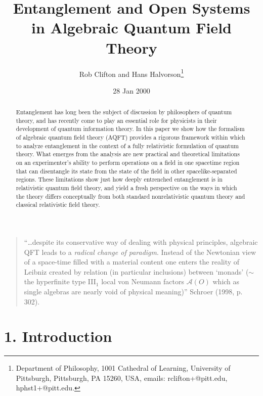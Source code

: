 \documentclass[12pt]{article}
\date{28 Jan 2000}
\title{Entanglement and Open Systems in Algebraic Quantum Field Theory}
\author{Rob Clifton and Hans Halvorson\footnote{Department of Philosophy,
 1001 Cathedral of
Learning, University of
Pittsburgh, Pittsburgh, PA 15260, USA, emails: rclifton+@pitt.edu, 
hphst1+@pitt.edu.}}
\newcommand{\alg}[1]{\mbox{$\mathcal{#1}$}}
\begin{document}
\maketitle 
\begin{abstract}
Entanglement has long been the subject of discussion by philosophers 
of quantum theory, and has recently come to play an essential role 
for physicists in their development of quantum information theory.  
In this paper we show how the formalism of algebraic quantum 
field theory (AQFT) provides a rigorous framework within which to 
analyze entanglement in the context of a fully relativistic formulation 
of quantum theory.  What emerges from the analysis 
are new practical and theoretical limitations on an 
experimenter's ability to perform operations on a field in one spacetime region 
that can disentangle its state from the state of the field in other 
spacelike-separated regions.  These limitations show just how deeply 
entrenched entanglement is in relativistic quantum field theory, and yield a 
fresh perspective on the ways in which the theory differs conceptually 
from both standard
nonrelativistic quantum theory and classical relativistic field 
theory.         
  \end{abstract} 

\newpage

  \begin{quote}
``\ldots despite its conservative way of dealing with physical 
principles, algebraic QFT leads to a \emph{radical change of 
paradigm}.  Instead of the Newtonian view of a space-time filled with 
a material content one enters the reality of Leibniz created by 
relation (in particular inclusions) between `monads' ($\sim$ the 
hyperfinite type III$_{1}$ local von Neumann factors $\alg{A}(O)$ which 
as single algebras are nearly void of physical meaning)'' Schroer  
(1998, p. 302).
\end{quote}
   
 \section*{1. Introduction}
 
\end{document}
